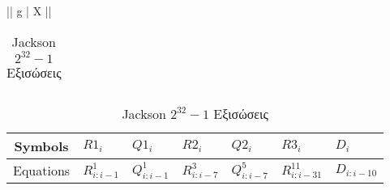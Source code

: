 \begin{table}[H]
\begin{tabularx}{\textwidth}{|| g | X ||}
    
    \end{tabularx}
    
    \begin{tabularx}{\textwidth}{X} 
    \\
    \end{tabularx}  
    
    
    \begin{tabularx}{\textwidth}{| c | X X X X X X | } 
        \hline%
        Symbols & $R1_i$ & $Q1_i$ & $R2_i$ & $Q2_i$ & $R3_i$ & $D_i$ \\
        \hline%
        Equations & $R^1_{i:i-1}$ & $Q^1_{i:i-1}$ & $R^3_{i:i-7}$ & $Q^5_{i:i-7}$ 
        & $R^{11}_{i:i-31}$ & $ D_{i:i-10}$ \\
        \hline
    \end{tabularx}
    
    
\caption{Jackson $2^{32}-1$ Εξισώσεις}
\end{table}

